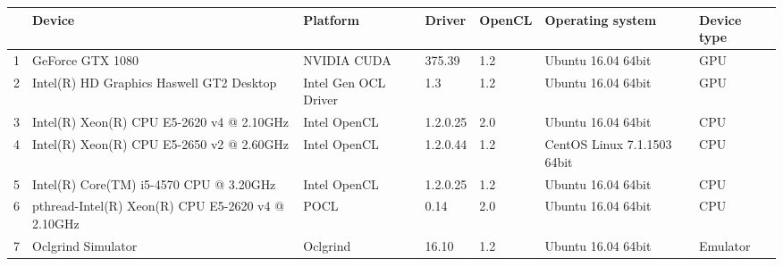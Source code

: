 \begin{tabular}{lllllll}
\toprule
{} &                                             Device &              Platform &    Driver & OpenCL &             Operating system & Device type \\
\midrule
1 &                                   GeForce GTX 1080 &           NVIDIA CUDA &    375.39 &    1.2 &           Ubuntu 16.04 64bit &         GPU \\
2 &           Intel(R) HD Graphics Haswell GT2 Desktop &  Intel Gen OCL Driver &       1.3 &    1.2 &           Ubuntu 16.04 64bit &         GPU \\
3 &          Intel(R) Xeon(R) CPU E5-2620 v4 @ 2.10GHz &          Intel OpenCL &  1.2.0.25 &    2.0 &           Ubuntu 16.04 64bit &         CPU \\
4 &          Intel(R) Xeon(R) CPU E5-2650 v2 @ 2.60GHz &          Intel OpenCL &  1.2.0.44 &    1.2 &  CentOS Linux 7.1.1503 64bit &         CPU \\
5 &            Intel(R) Core(TM) i5-4570 CPU @ 3.20GHz &          Intel OpenCL &  1.2.0.25 &    1.2 &           Ubuntu 16.04 64bit &         CPU \\
6 &  pthread-Intel(R) Xeon(R) CPU E5-2620 v4 @ 2.10GHz &                  POCL &      0.14 &    2.0 &           Ubuntu 16.04 64bit &         CPU \\
7 &                                 Oclgrind Simulator &              Oclgrind &     16.10 &    1.2 &           Ubuntu 16.04 64bit &    Emulator \\
\bottomrule
\end{tabular}
